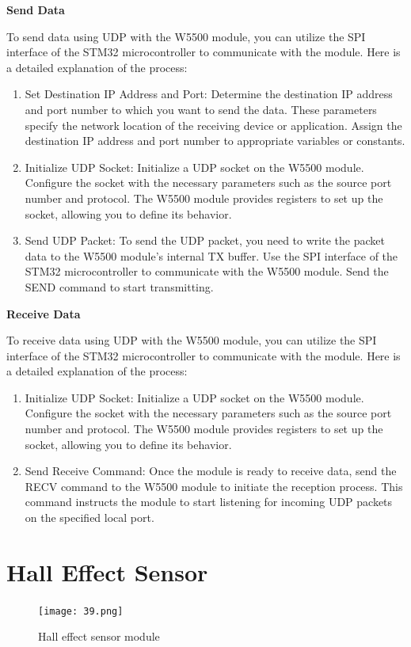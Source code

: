 \documentclass[
12pt,
oneside, 
onehalfspacing, 
nolistspacing, 
parskip, 
chapterinoneline, 
]{AASTCOMPUTER}
\begin{document}
\textbf{Send Data}

To send data using UDP with the W5500 module, you can utilize the SPI interface of the STM32 microcontroller to communicate with the module. Here is a detailed explanation of the process:
\begin{enumerate}
    \item Set Destination IP Address and Port: Determine the destination IP address and port number to which you want to send the data. These parameters specify the network location of the receiving device or application. Assign the destination IP address and port number to appropriate variables or constants.
    \item Initialize UDP Socket: Initialize a UDP socket on the W5500 module. Configure the socket with the necessary parameters such as the source port number and protocol. The W5500 module provides registers to set up the socket, allowing you to define its behavior.
    \item Send UDP Packet: To send the UDP packet, you need to write the packet data to the W5500 module's internal TX buffer. Use the SPI interface of the STM32 microcontroller to communicate with the W5500 module. Send the SEND command to start transmitting.
\end{enumerate}

\textbf{Receive Data}

To receive data using UDP with the W5500 module, you can utilize the SPI interface of the STM32 microcontroller to communicate with the module. Here is a detailed explanation of the process:
\begin{enumerate}
    \item Initialize UDP Socket: Initialize a UDP socket on the W5500 module. Configure the socket with the necessary parameters such as the source port number and protocol. The W5500 module provides registers to set up the socket, allowing you to define its behavior.
    \item Send Receive Command: Once the module is ready to receive data, send the RECV command to the W5500 module to initiate the reception process. This command instructs the module to start listening for incoming UDP packets on the specified local port.
\end{enumerate}

\section{Hall Effect Sensor}
\begin{figure}[!ht]
\centering
\texttt{[image: 39.png]}
\caption[Hall effect sensor module]{Hall effect sensor module}
\label{fig:TCU}
\end{figure}
\end{document}
